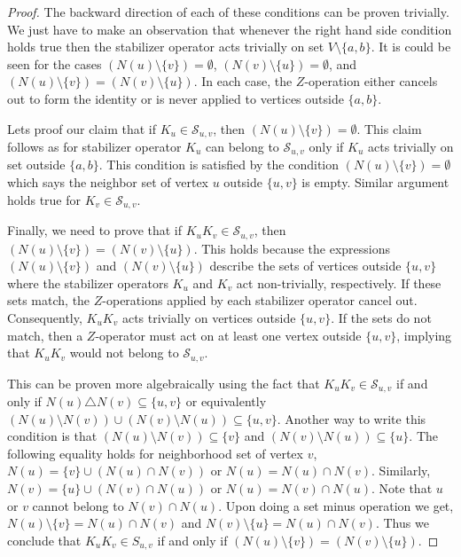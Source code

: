 \documentclass{article}
\begin{document}
\begin{proof}
The backward direction of each of these conditions can be proven trivially. We just have to make an observation that whenever the right hand side condition holds true then the stabilizer operator acts trivially on set $V \setminus \{a, b\}$. It is could be seen for the cases $ (N(u) \setminus \{v\}) = \emptyset $, $ (N(v) \setminus \{u\}) = \emptyset $, and $ (N(u) \setminus \{v\}) = (N(v) \setminus \{u\}) $. In each case, the $ Z $-operation either cancels out to form the identity or is never applied to vertices outside $ \{a, b\} $.

Lets proof our claim that if $K_u \in \mathcal{S}_{u,v}$, then $ (N(u) \setminus \{v\}) = \emptyset $. This claim follows as for stabilizer operator $K_u$ can belong to $ \mathcal{S}_{u,v}$ only if $K_u$ acts trivially on set outside $\{a, b\}$. This condition is satisfied by the condition  $ (N(u) \setminus \{v\}) = \emptyset $ which says the neighbor set of vertex $u$ outside $\{u, v\}$ is empty. Similar argument holds true for $K_v \in \mathcal{S}_{u,v}$.

Finally, we need to prove that if $ K_u K_v \in \mathcal{S}_{u,v} $, then $ (N(u) \setminus \{v\}) = (N(v) \setminus \{u\}) $. This holds because the expressions $ (N(u) \setminus \{v\}) $ and $ (N(v) \setminus \{u\}) $ describe the sets of vertices outside $ \{u, v\} $ where the stabilizer operators $ K_u $ and $ K_v $ act non-trivially, respectively. If these sets match, the $ Z $-operations applied by each stabilizer operator cancel out. Consequently, $ K_u K_v $ acts trivially on vertices outside $ \{u, v\} $. If the sets do not match, then a $ Z $-operator must act on at least one vertex outside $ \{u, v\} $, implying that $ K_u K_v $ would not belong to $ \mathcal{S}_{u,v} $. 


This can be proven more algebraically using the fact that $ K_u K_v \in \mathcal{S}_{u,v} $ if and only if $ N(u) \triangle N(v) \subseteq \{u, v\} $ or equivalently $(N(u) \setminus N(v)) \cup (N(v) \setminus N(u)) \subseteq \{u, v\}$. Another way to write this condition is that $(N(u) \setminus N(v)) \subseteq \{v\}$ and $(N(v) \setminus N(u)) \subseteq \{u\}$. The following equality holds for neighborhood set of vertex $v$, $N(u) = \{v\} \cup (N(u) \cap N(v))$ or $N(u) = N(u) \cap N(v)$. Similarly, $N(v) = \{u\} \cup (N(v) \cap N(u))$ or $N(u) = N(v) \cap N(u)$. Note that $u$ or $v$ cannot belong to $N(v) \cap N(u)$. Upon doing a set minus operation we get, $N(u) \setminus \{v\}= N(u) \cap N(v)$ and $N(v) \setminus \{u\}= N(u) \cap N(v)$. Thus we conclude that $ K_u K_v \in S_{u,v} $ if and only if $ (N(u) \setminus \{v\}) = (N(v) \setminus \{u\}) $.

\end{proof}
\end{document}
